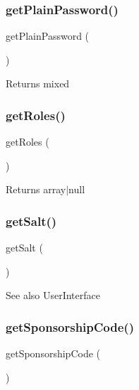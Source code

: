 \subsubsection{\texorpdfstring{getPlainPassword()}{getPlainPassword()}}
{\footnotesize\ttfamily get\+Plain\+Password (\begin{DoxyParamCaption}{ }\end{DoxyParamCaption})}

\begin{DoxyReturn}{Returns}
mixed 
\end{DoxyReturn}
\mbox{\label{class_app_1_1_entity_1_1_user_aa676cae5ee8d7fb6862a8724adc2660d}} 
\subsubsection{\texorpdfstring{getRoles()}{getRoles()}}
{\footnotesize\ttfamily get\+Roles (\begin{DoxyParamCaption}{ }\end{DoxyParamCaption})}

\begin{DoxyReturn}{Returns}
array$\vert$null 
\end{DoxyReturn}
\mbox{\label{class_app_1_1_entity_1_1_user_a1dfe56d2c965d451a135f3f3910a8b8d}} 
\subsubsection{\texorpdfstring{getSalt()}{getSalt()}}
{\footnotesize\ttfamily get\+Salt (\begin{DoxyParamCaption}{ }\end{DoxyParamCaption})}

\begin{DoxySeeAlso}{See also}
User\+Interface 
\end{DoxySeeAlso}
\mbox{\label{class_app_1_1_entity_1_1_user_ac33851e878a0d81b8bd13b058c854224}} 
\subsubsection{\texorpdfstring{getSponsorshipCode()}{getSponsorshipCode()}}
{\footnotesize\ttfamily get\+Sponsorship\+Code (\begin{DoxyParamCaption}{ }\end{DoxyParamCaption})}

